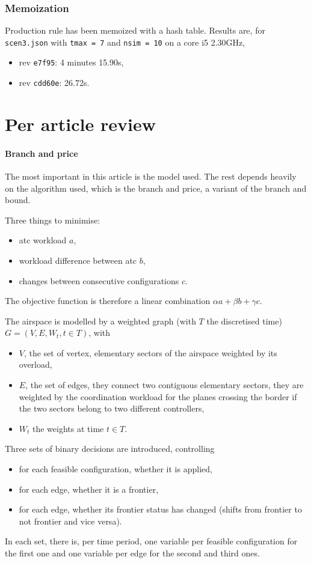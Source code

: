 \documentclass{article}
\begin{document}
\subsubsection{Memoization}
Production rule has been memoized with a hash table. Results are, for
\texttt{scen3.json} with \texttt{tmax = 7} and \texttt{nsim = 10} on a core i5
\@ 2.30GHz,
\begin{itemize}
  \item rev \texttt{e7f95}: 4 minutes 15.90s,
  \item rev \texttt{cdd60e}: 26.72s.
\end{itemize}

\section{Per article review}
\paragraph{Branch and price~\cite{treimuth2016branch}}
The most important in this article is the model used. The rest depends heavily
on the algorithm used, which is the branch and price, a variant of the branch
and bound.

Three things to minimise:
\begin{itemize}
  \item atc workload \(a\),
  \item workload difference between atc \(b\),
  \item changes between consecutive configurations \(c\).
\end{itemize}
The objective function is therefore a linear combination \(\alpha a + \beta b +
\gamma c\).

The airspace is modelled by a weighted graph (with \(T\) the discretised time)
\(G = (V, E, W_t, t\in T)\), with
\begin{itemize}
  \item \(V\), the set of vertex, elementary sectors of the airspace weighted by
    its overload,
  \item \(E\), the set of edges, they connect two contiguous elementary sectors,
    they are weighted by the coordination workload for the planes crossing the
    border if the two sectors belong to two different controllers,
  \item \(W_t\) the weights at time \(t\in T\).
\end{itemize}


Three sets of binary decisions are introduced, controlling
\begin{itemize}
  \item for each feasible configuration, whether it is applied,
  \item for each edge, whether it is a frontier,
  \item for each edge, whether its frontier status has changed (shifts from
    frontier to not frontier and vice versa).
\end{itemize}
In each set, there is, per time period, one variable per feasible configuration
for the first one and one variable per edge for the second and third ones.
\end{document}
